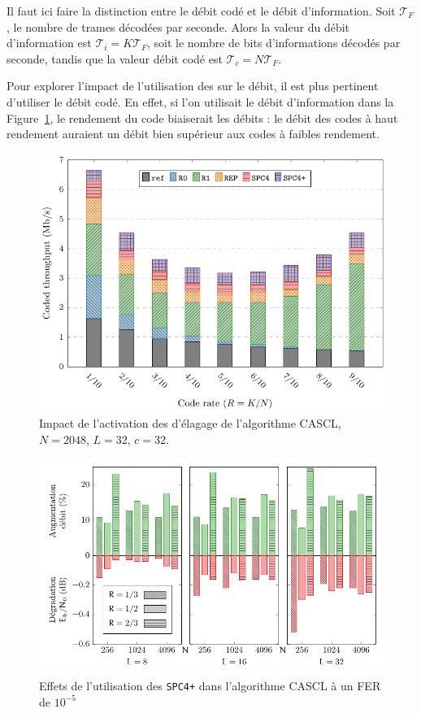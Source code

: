 Il faut ici faire la distinction entre le débit codé et le débit d'information. Soit $\mathcal{T}_F$, le nombre de trames décodées par seconde. Alors la valeur du débit d'information est $\mathcal{T}_i=K\mathcal{T}_F$, soit le nombre de bits d'informations décodés par seconde, tandis que la valeur débit codé est $\mathcal{T}_c=N\mathcal{T}_F$.

Pour explorer l'impact de l'utilisation des \noeuds sur le débit, il est  plus pertinent d'utiliser le débit codé. En effet, si l'on utilisait le débit d'information dans la Figure~\ref{fig:nodes}, le rendement du code biaiserait les débits : le débit des codes à haut rendement auraient un débit bien supérieur aux codes à faibles rendement.
\begin{figure}[t]
\includegraphics[width=\textwidth]{main/ch2_fig/curves/tree/tikz/tree}
\caption{Impact de l'activation des \noeuds d'élagage de l'algorithme CASCL, $N=2048$, $L=32$, $c=32$.}
\label{fig:nodes}
\end{figure}

\begin{figure}[t]
\includegraphics[width=\textwidth]{main/ch2_fig/curves/thr_spc/tikz/thr_spc_diff}
\caption{Effets de l'utilisation des \noeuds \texttt{SPC4+} dans l'algorithme CASCL à un FER de $10^{-5}$}
\label{fig:spc_impact}
\end{figure}

